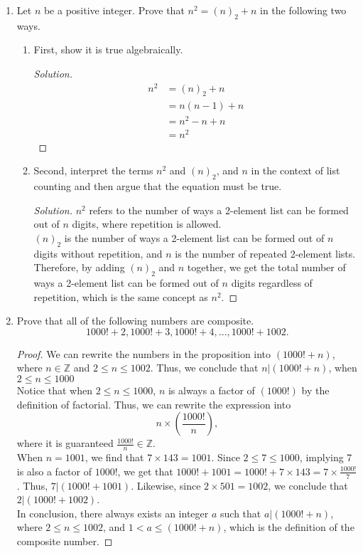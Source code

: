 \documentclass[12pt]{article}
\newcommand{\Z}{\mathbb{Z}}
\renewcommand\qedsymbol{$\blacksquare$}
\newenvironment{solution}
{\begin{proof}[Solution]\renewcommand\qedsymbol{$\square$}}
	{\end{proof}}
\begin{document}
	\begin{enumerate}
		\item 
		Let $n$ be a positive integer. Prove that $n^2 = (n)_2 + n$ in the following two ways.
		
		\begin{enumerate}[label=(\alph*)]
			\item 
			First, show it is true algebraically.
			\begin{solution}
				\begin{align*}
					n^2 &= (n)_2 + n\\
					&= n(n-1) + n\\
					&= n^2 - n + n\\
					&= n^2
				\end{align*}
			\end{solution}
			\item
			Second, interpret the terms $n^2$ and $(n)_2$, and $n$ in the context of list counting and then argue that the equation must be true.
			\begin{solution}
				$n^2$ refers to the number of ways a 2-element list can be formed out of $n$ digits, where repetition is allowed.\\
				$(n)_2$ is the number of ways a 2-element list can be formed out of $n$ digits without repetition, and $n$ is the number of repeated 2-element lists. Therefore, by adding $(n)_2$ and $n$ together, we get the total number of ways a 2-element list can be formed out of $n$ digits regardless of repetition, which is the same concept as $n^2$.
			\end{solution}
			
		\end{enumerate}
		
		\item
		Prove that all of the following numbers are composite.
		\[1000! + 2,  1000! + 3,  1000! + 4, . . . ,  1000! + 1002.\]
		\begin{proof}
			We can rewrite the numbers in the proposition into $(1000!+n)$, where $n\in \Z$ and $2\leq n\leq 1002$. Thus, we conclude that $n|(1000!+n)$, when $2\leq n\leq 1000$\\
			Notice that when $2\leq n\leq 1000$, $n$ is always a factor of $(1000!)$ by the definition of factorial. Thus, we can rewrite the expression into \[ n\times (\frac{1000!}{n}), \] where it is guaranteed $\displaystyle \frac{1000!}{n}\in \Z$.\\
			When $n=1001$, we find that $7\times 143 = 1001$. Since $2\leq 7\leq 1000$, implying 7 is also a factor of $1000!$, we get that $\displaystyle 1000!+1001 = 1000!+7\times 143 = 7\times \frac{1000!}{7}$. Thus, $7|(1000!+1001)$.\clearpage
			Likewise, since $2\times 501 = 1002$, we conclude that $2|(1000!+1002)$.\\ 
			In conclusion, there always exists an integer $a$ such that $a|(1000!+n)$, where $2\leq n\leq 1002$, and $1<a\leq (1000!+n)$, which is the definition of the composite number.
		\end{proof}
		

\end{enumerate}
\end{document}
